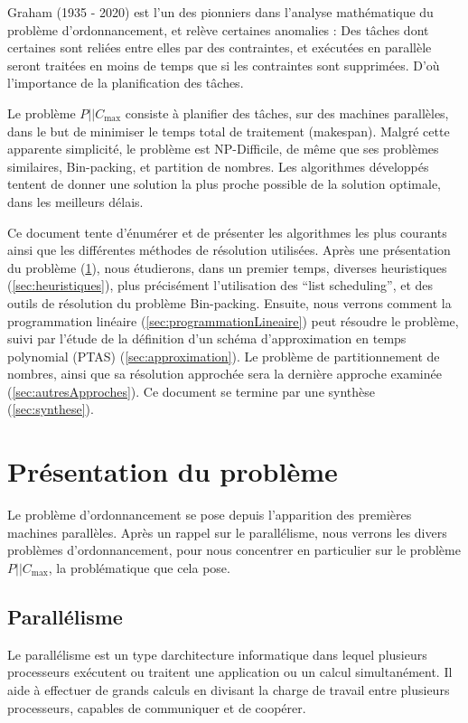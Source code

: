 \documentclass[a4paper,12pt]{report}
\theoremstyle{plain}				%
\theoremstyle{definition}				%
\newcommand\problemGrahamP{$P||C_{\max}$\xspace}
\newcommand{\fco}[1]{\todo[author=FCO,color=blue,inline]{#1}}
\newcommand{\jb}[1]{\todo[author=JB,color=orange,inline]{#1}}
\begin{document}
Graham (1935 - 2020) est l'un des pionniers dans l'analyse
mathématique du problème d'ordonnancement, et relève certaines
anomalies \cite{graham1966bounds}: Des tâches dont certaines sont
reliées entre elles par des contraintes, et exécutées en parallèle
seront traitées en moins de temps que si les contraintes sont
supprimées.
D'où l'importance de la planification des tâches.

Le problème \problemGrahamP consiste à planifier des tâches, sur des
machines parallèles, dans le but de minimiser le temps total de
traitement (makespan).
Malgré cette apparente simplicité, le problème est NP-Difficile, de
même que ses problèmes similaires, Bin-packing, et partition de
nombres.
Les algorithmes développés tentent de donner une solution la plus
proche possible de la solution optimale, dans les meilleurs délais.

Ce document tente d’énumérer et de présenter les algorithmes les plus
courants ainsi que les différentes méthodes de résolution utilisées.
Après une présentation du problème (\ref{sec:pesentationProbleme}),
nous étudierons, dans un premier temps, diverses heuristiques (\ref{sec:heuristiques}),
  plus précisément l'utilisation des ``list scheduling'',
  et des outils de résolution du problème Bin-packing.
Ensuite, nous verrons comment la programmation linéaire
  (\ref{sec:programmationLineaire}) peut résoudre le problème,
suivi par l'étude de la définition d'un schéma d'approximation
  en temps polynomial (PTAS) (\ref{sec:approximation}).
Le problème de partitionnement de nombres, ainsi que sa
  résolution approchée sera la dernière approche examinée
  (\ref{sec:autresApproches}).
Ce document se termine par une synthèse (\ref{sec:synthese}).

\jb{Mettre des références vers les sections}
\fco{ok, fait}

\section{Présentation du problème} \label{sec:pesentationProbleme}

Le problème d'ordonnancement se pose depuis l'apparition des premières
machines parallèles.
Après un rappel sur le parallélisme, nous verrons les divers problèmes
d'ordonnancement, pour nous concentrer en particulier sur le problème
\problemGrahamP, la problématique que cela pose.


\subsection{Parallélisme} \label{ssec:pesentationProblemeParallelisme}
Le parallélisme est un type d{\textquotesingle}architecture informatique
dans lequel plusieurs processeurs exécutent ou traitent une application
ou un calcul simultanément. Il aide à effectuer de grands calculs en
divisant la charge de travail entre plusieurs processeurs, capables de
communiquer et de coopérer.
\end{document}
